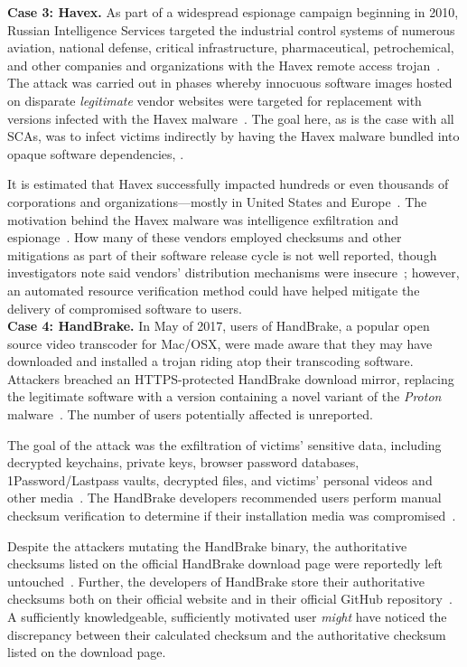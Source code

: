 \noindent\textbf{Case 3: Havex.} As part of a widespread espionage campaign
beginning in 2010, Russian Intelligence Services targeted the industrial control
systems of numerous aviation, national defense, critical infrastructure,
pharmaceutical, petrochemical, and other companies and organizations with the
Havex remote access trojan~\cite{SCA-HAVEX1, SCA-HAVEX2}. The attack was carried
out in phases whereby innocuous software images hosted on disparate
\emph{legitimate} vendor websites were targeted for replacement with versions
infected with the Havex malware~\cite{SCA-HAVEX2}. The goal here, as is the case
with all SCAs, was to infect victims indirectly by having the Havex malware
bundled into opaque software dependencies, .

It is estimated that Havex successfully impacted hundreds or even thousands of
corporations and organizations---mostly in United States and
Europe~\cite{SCA-HAVEX2}. The motivation behind the Havex malware was
intelligence exfiltration and espionage~\cite{SCA-HAVEX1}. How many of these
vendors employed checksums and other mitigations as part of their software
release cycle is not well reported, though investigators note said vendors'
distribution mechanisms were insecure~\cite{SCA-HAVEX2}; however, an automated
resource verification method could have helped mitigate the delivery of
compromised software to users. \\

\noindent\textbf{Case 4: HandBrake.} In May of 2017, users of HandBrake, a
popular open source video transcoder for Mac/OSX, were made aware that they may
have downloaded and installed a trojan riding atop their transcoding software.
Attackers breached an HTTPS-protected HandBrake download mirror, replacing the
legitimate software with a version containing a novel variant of the
\emph{Proton} malware~\cite{SCA-HB1}. The number of users potentially affected
is unreported.

The goal of the attack was the exfiltration of victims' sensitive data,
including decrypted keychains, private keys, browser password databases,
1Password/Lastpass vaults, decrypted files, and victims' personal videos and
other media~\cite{SCA-HB1}. The HandBrake developers recommended users perform
manual checksum verification to determine if their installation media was
compromised~\cite{SCA-HB2}.

Despite the attackers mutating the HandBrake binary, the authoritative checksums
listed on the official HandBrake download page were reportedly left
untouched~\cite{SCA-HB2}. Further, the developers of HandBrake store their
authoritative checksums both on their official website and in their official
GitHub repository~\cite{SCA-HB2}. A sufficiently knowledgeable, sufficiently
motivated user \emph{might} have noticed the discrepancy between their
calculated checksum and the authoritative checksum listed on the download page.

